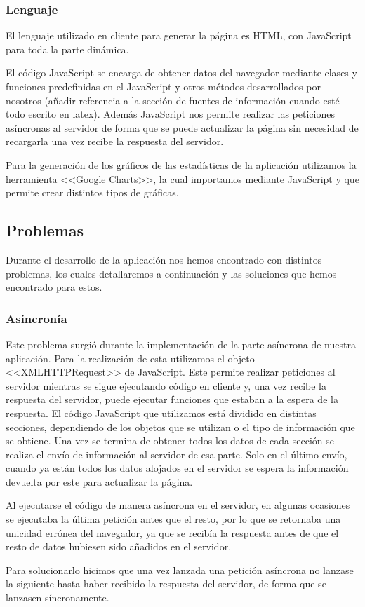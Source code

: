 \subsubsection{Lenguaje}
El lenguaje utilizado en cliente para generar la página es HTML, con JavaScript para toda la parte dinámica.\par
El código JavaScript se encarga de obtener datos del navegador mediante clases y funciones predefinidas en el JavaScript y otros métodos desarrollados por nosotros (añadir referencia a la sección de fuentes de información cuando esté todo escrito en latex). Además JavaScript nos permite realizar las peticiones asíncronas al servidor de forma que se puede actualizar la página sin necesidad de recargarla una vez recibe la respuesta del servidor.\par 
Para la generación de los gráficos de las estadísticas de la aplicación utilizamos la herramienta <<Google Charts>>, la cual importamos mediante JavaScript y que permite crear distintos tipos de gráficas.
\subsection{Problemas}
Durante el desarrollo de la aplicación nos hemos encontrado con distintos problemas, los cuales detallaremos a continuación y las soluciones que hemos encontrado para estos.
\subsubsection{Asincronía}
Este problema surgió durante la implementación de la parte asíncrona de nuestra aplicación. Para la realización de esta utilizamos el objeto  <<XMLHTTPRequest>> de JavaScript. Este permite realizar peticiones al servidor mientras se sigue ejecutando código en cliente y, una vez recibe la respuesta del servidor, puede ejecutar funciones que estaban a la espera de la respuesta. El código JavaScript que utilizamos está dividido en distintas secciones, dependiendo de los objetos que se utilizan o el tipo de información que se obtiene. Una vez se termina de obtener todos los datos de cada sección se realiza el envío de información al servidor de esa parte. Solo en el último envío, cuando ya están todos los datos alojados en el servidor se espera la información devuelta por este para actualizar la página.\par 
Al ejecutarse el código de manera asíncrona en el servidor, en algunas ocasiones se ejecutaba la última petición antes que el resto, por lo que se retornaba una unicidad errónea del navegador, ya que se recibía la respuesta antes de que el resto de datos hubiesen sido añadidos en el servidor.\par 
Para solucionarlo hicimos que una vez lanzada una petición asíncrona no lanzase la siguiente hasta haber recibido la respuesta del servidor, de forma que se lanzasen síncronamente.
